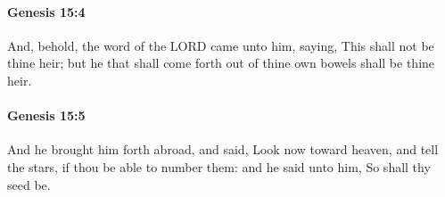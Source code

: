 		\paragraph{Genesis 15:4} %
			\label{GENESIS-15-4}

			And, behold, the word of the LORD came unto him, saying, This shall not be thine heir; but he that shall come forth out of thine own bowels shall be thine heir.


		\paragraph{Genesis 15:5} %
			\label{GENESIS-15-5}

			And he brought him forth abroad, and said, Look now toward heaven, and tell the stars, if thou be able to number them: and he said unto him, So shall thy seed be.


